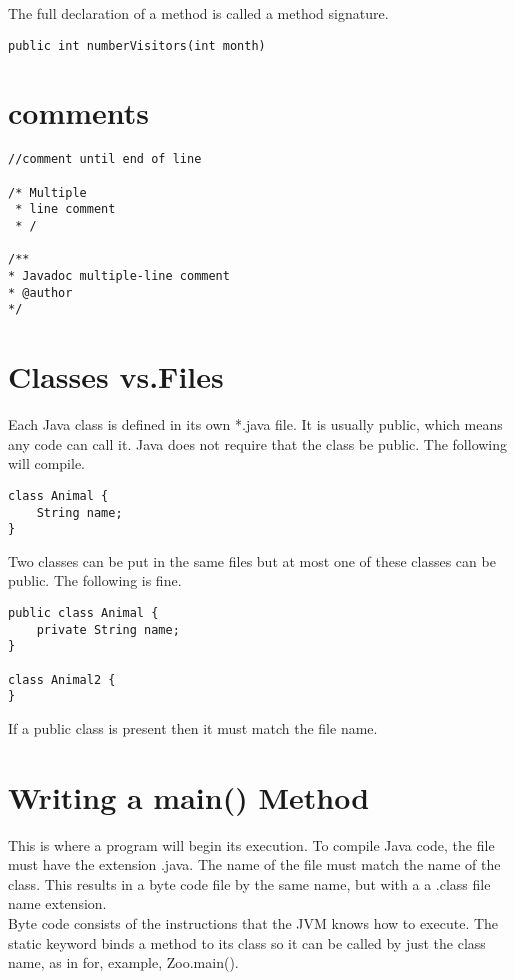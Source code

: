 \documentclass[a4paper]{report}   %
\begin{document}
The full declaration of a method is called a method signature.

\begin{lstlisting}
public int numberVisitors(int month)
\end{lstlisting}

\section{comments}

\begin{lstlisting}
//comment until end of line

/* Multiple
 * line comment
 * /
 
/**
* Javadoc multiple-line comment
* @author
*/
\end{lstlisting}

\section{Classes vs.Files}

Each Java class is defined in its own *.java file. It is usually public, which means any code can call it. Java does not require that the class be public. The following will compile.

\begin{lstlisting}
class Animal {
	String name;
}
\end{lstlisting}

Two classes can be put in the same files but at most one of these classes can be public. The following is fine. 

\begin{lstlisting}
public class Animal {
	private String name;
}

class Animal2 {
}
\end{lstlisting}

If a public class is present then it must match the file name.

\section{Writing a main() Method}

This is where a program will begin its execution. To compile Java code, the file must have the extension .java. The name of the file must match the name of the class. This results in a byte code file by the same name, but with a a .class file name extension. \\
Byte code consists of the instructions that the JVM knows how to execute. The static keyword binds a method to its class so it can be called by just the class name, as in for, example, Zoo.main().\\
\end{document}
